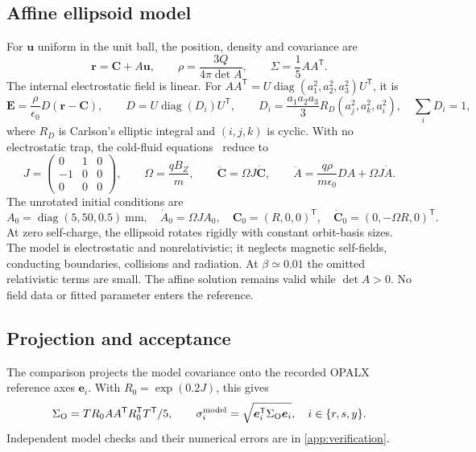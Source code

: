 \documentclass[10pt,a4paper]{article}
\newcommand{\T}{\mathsf T}
\newcommand{\eps}{\epsilon_0}
\begin{document}
\subsection{Affine ellipsoid model}
For $\bm u$ uniform in the unit ball, the position, density and covariance are
\begin{equation}
 \bm r=\bm C+A\bm u,\qquad
 \rho=\frac{3Q}{4\pi\det A},\qquad
 \Sigma=\frac15 AA^\T .\label{eq:affine}
\end{equation}
The internal electrostatic field is linear. For
$AA^\T=U\operatorname{diag}(a_1^2,a_2^2,a_3^2)U^\T$, it is
\begin{equation}
 \bm E=\frac{\rho}{\eps}D(\bm r-\bm C),\qquad
 D=U\operatorname{diag}(D_i)U^\T,\qquad
 D_i=\frac{a_1a_2a_3}{3}R_D(a_j^2,a_k^2,a_i^2),\quad \sum_iD_i=1,
 \label{eq:field}
\end{equation}
where $R_D$ is Carlson's elliptic integral and $(i,j,k)$ is cyclic.
With no electrostatic trap, the cold-fluid equations~\cite{dubin} reduce to
\begin{equation}
 J=\begin{pmatrix}0&1&0\\-1&0&0\\0&0&0\end{pmatrix},\qquad
 \Omega=\frac{qB_Z}{m},\qquad
 \ddot{\bm C}=\Omega J\dot{\bm C},\qquad
 \ddot A=\frac{q\rho}{m\eps}DA+\Omega J\dot A .\label{eq:model}
\end{equation}
The unrotated initial conditions are
\begin{equation}
 A_0=\operatorname{diag}(5,50,0.5)~\mathrm{mm},\quad
 \dot A_0=\Omega JA_0,\quad
 \bm C_0=(R,0,0)^\T,\quad
 \dot{\bm C}_0=(0,-\Omega R,0)^\T .
\end{equation}
At zero self-charge, the ellipsoid rotates rigidly with constant orbit-basis
sizes. The model is electrostatic and nonrelativistic; it neglects magnetic
self-fields, conducting boundaries, collisions and radiation. At $\beta\simeq
0.01$ the omitted relativistic terms are small. The affine solution remains
valid while $\det A>0$. No field data or fitted parameter enters the reference.

\subsection{Projection and acceptance}
The comparison projects the model covariance onto the recorded OPALX reference
axes $\bm e_i$. With $R_0=\exp(0.2J)$, this gives
\begin{equation}
 \Sigma_{\rm O}=T R_0AA^\T R_0^\T T^\T/5,\qquad
 \sigma_i^{\rm model}=\sqrt{\bm e_i^\T\Sigma_{\rm O}\bm e_i},\quad i\in\{r,s,y\}.
 \label{eq:projection}
\end{equation}
Independent model checks and their numerical errors are in
\cref{app:verification}.
\end{document}
